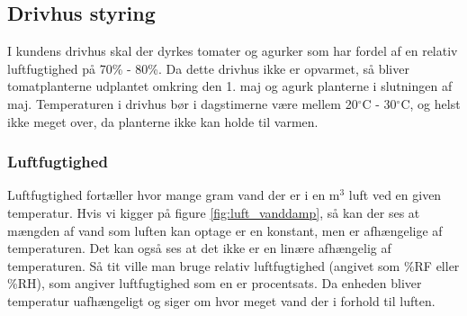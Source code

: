 \subsection{Drivhus styring}

I kundens drivhus skal der dyrkes tomater og agurker som har fordel af en relativ luftfugtighed på 70\% - 80\%.
Da dette drivhus ikke er opvarmet, så bliver tomatplanterne udplantet omkring den 1. maj og agurk planterne i slutningen af maj.
Temperaturen i drivhus bør i dagstimerne være mellem 20$^\circ$C - 30$^\circ$C, og helst ikke meget over, da planterne ikke kan holde til varmen.

\subsubsection{Luftfugtighed}
Luftfugtighed fortæller hvor mange gram vand der er i en m$^3$ luft ved en given temperatur.
Hvis vi kigger på figure \ref{fig:luft_vanddamp}, så kan der ses at mængden af vand som luften kan optage er en konstant, men er afhængelige af temperaturen.
Det kan også ses at det ikke er en linære afhængelig af temperaturen.
Så tit ville man bruge relativ luftfugtighed (angivet som \%RF eller \%RH), som angiver luftfugtighed som en er procentsats. 
Da enheden bliver temperatur uafhængeligt og siger om hvor meget vand der i forhold til luften.






